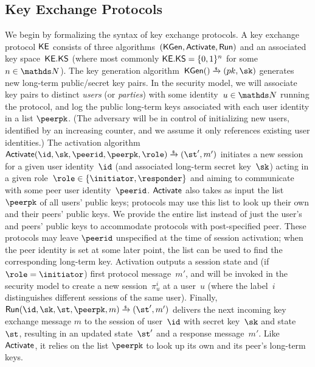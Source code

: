 \subsection{Key Exchange Protocols}

\label{sec:ake-syntax}
We begin by formalizing the syntax of key exchange protocols.
A key exchange protocol $\mathsf{KE}$ consists of three algorithms~$(\mathsf{KGen},\allowbreak \mathsf{Activate},\allowbreak \mathsf{Run})$
and an associated key space~$\mathsf{KE}.\mathsf{KS}$ (where most commonly $\mathsf{KE}.\mathsf{KS} = \{0,1\}^n$ for some $n \in \NN$).
The key generation algorithm~$\KEKGen() \tor (\pk\cab \sk)$ generates new long-term public/secret key pairs.
In the security model, we will associate key pairs to distinct \emph{users} (or \emph{parties}) with some identity~$u \in \NN$ running the protocol,
and log the public long-term keys associated with each user identity in a list $\peerpk$.
(The adversary will be in control of initializing new users, identified by an increasing counter, and we assume it only references existing user identities.)
The activation algorithm~$\KEActivate(\id, \sk, \peerid, \peerpk, \role) \tor (\st', m')$ initiates a new session for a given user identity~$\id$ (and associated long-term secret key~$\sk$) acting in a given role~$\role \in \{\initiator\cab \responder\}$ and aiming to communicate with some peer user identity~$\peerid$.
$\mathsf{Activate}$ also takes as input the list $\peerpk$ of all users' public keys; protocols may use this list to look up their own and their peers' public keys. 
We provide the entire list instead of just the user's and peers' public keys to accommodate protocols with post-specified peer. 
These protocols may leave $\peerid$ unspecified at the time of session activation; when the peer identity is set at some later point, the list can be used to find the corresponding long-term key. 
Activation outputs a session state and (if $\role = \initiator$) first protocol message~$m'$, and will be invoked in the security model to create a new session~$\pi_u^i$ at a user~$u$ (where the label~$i$ distinguishes different sessions of the same user).
Finally, $\KERun(\id, \sk, \st,\peerpk, m) \tor (\st', m')$ delivers the next incoming key exchange message $m$ to the session of user~$\id$ with secret key~$\sk$ and state $\st$, resulting in an updated state~$\st'$ and a response message~$m'$. Like $\mathsf{Activate}$, it relies on the list $\peerpk$ to look up its own and its peer's long-term keys. 

